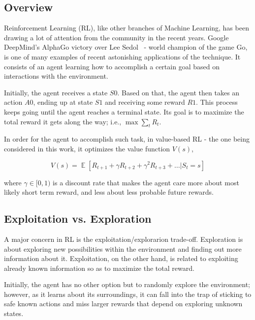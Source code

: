 \documentclass[11pt,twoside]{article}
\DeclareMathOperator*{\E}{\mathbb{E}}
\begin{document}
\subsection{Overview}

Reinforcement Learning (RL), like other branches of Machine Learning, has been drawing a lot of attention from the community in the recent years. Google DeepMind's AlphaGo victory over Lee Sedol~\cite{googlelee} - world champion of the game Go, is one of many examples of recent astonishing applications of the technique. It consists of an agent learning how to accomplish a certain goal based on interactions with the environment.

Initially, the agent receives a state $S0$. Based on that, the agent then takes an action $A0$, ending up at state $S1$ and receiving some reward $R1$. This process keeps going until the agent reaches a terminal state. Its goal is to maximize the total reward it gets along the way; i.e., $\max \sum_{t} R_t$. 

In order for the agent to accomplish such task, in value-based RL - the one being considered in this work, it optimizes the value function $V(s)$,


\begin{equation} \label{eq:1}
	V(s) = \E [R_{t+1} + \gamma R_{t+2} + \gamma^{2} R_{t+3} + \ldots | S_t = s] 
\end{equation}
 
where $\gamma \in [0,1)$ is a discount rate that makes the agent care more about most likely short term reward, and less about less probable future rewards.

\subsection{Exploitation vs. Exploration}
 
A major concern in RL is the exploitation/explorarion trade-off. Exploration is about exploring new possibilities within the environment and finding out more information about it. Exploitation, on the other hand, is related to exploiting already known information so as to maximize the total reward. 

Initially, the agent has no other option but to randomly explore the environment; however, as it learns about its surroundings, it can fall into the trap of sticking to safe known actions and miss larger rewards that depend on exploring unknown states.
\end{document}

